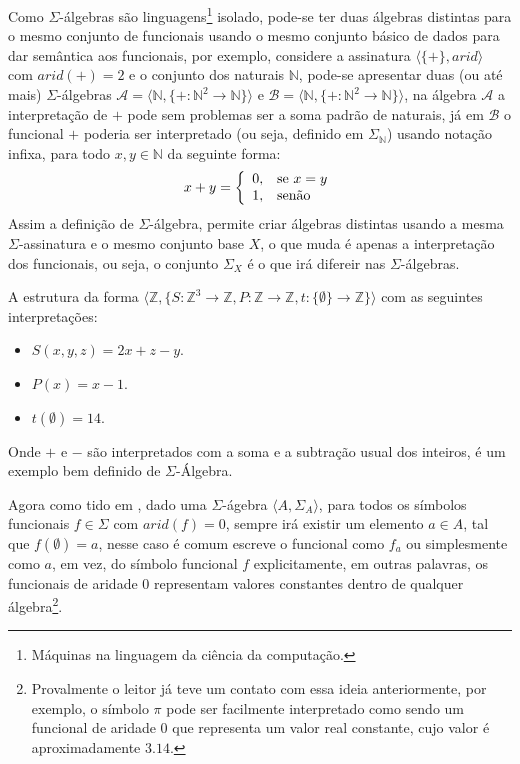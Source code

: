 \begin{nota}
  Como $\Sigma$-álgebras são linguagens\footnote{Máquinas na linguagem da ciência da computação.} isolado, pode-se ter duas álgebras distintas para o mesmo conjunto de funcionais usando o mesmo conjunto básico de dados para dar semântica aos funcionais, por exemplo, considere a assinatura $\langle \{+\}, arid \rangle$ com $arid(+)  = 2$ e o conjunto dos naturais $\mathbb{N}$, pode-se apresentar duas (ou até mais) $\Sigma$-álgebras $\mathcal{A} = \langle \mathbb{N}, \{+ :\mathbb{N}^2 \rightarrow \mathbb{N}\} \rangle$ e $\mathcal{B} = \langle \mathbb{N}, \{+ :\mathbb{N}^2 \rightarrow \mathbb{N}\} \rangle$, na álgebra $\mathcal{A}$ a interpretação de $+$ pode sem problemas ser a soma padrão de naturais, já em $\mathcal{B}$ o funcional $+$ poderia ser interpretado (ou seja, definido em $\Sigma_\mathbb{N}$) usando notação infixa, para todo $x, y \in \mathbb{N}$ da seguinte forma:
  \begin{eqnarray*}
    x + y = \left\{\begin{array}{ll}	0, & \hbox{se } x = y\\1,  & \hbox{senão}\end{array}\right.
  \end{eqnarray*}
  Assim a definição de $\Sigma$-álgebra, permite criar álgebras distintas usando a mesma $\Sigma$-assinatura e o mesmo conjunto base $X$, o que muda é apenas a interpretação dos funcionais, ou seja, o conjunto $\Sigma_X$ é o que irá difereir nas $\Sigma$-álgebras.
\end{nota}

\begin{exemplo}\label{exe:AlgebraUniversal1}
  A estrutura da forma $\langle \mathbb{Z}, \{S : \mathbb{Z}^3 \rightarrow \mathbb{Z}, P : \mathbb{Z} \rightarrow \mathbb{Z}, t:\{\emptyset\} \rightarrow \mathbb{Z} \} \rangle$ com as seguintes interpretações:
  \begin{itemize}
    \item $S(x, y, z) = 2x + z - y$.
    \item $P(x) = x - 1$.
    \item $t(\emptyset) = 14$.
  \end{itemize}
  Onde $+$ e $-$ são interpretados com a soma e a subtração usual dos inteiros, é um exemplo bem definido de $\Sigma$-Álgebra.
\end{exemplo}

Agora como tido em \cite{klaus2001}, dado uma $\Sigma$-ágebra $\langle A, \Sigma_A \rangle$, para todos os símbolos funcionais $f \in \Sigma$ com $arid(f) = 0$, sempre irá existir um elemento $a \in A$, tal que $f(\emptyset) = a$, nesse caso é comum escreve o funcional como $f_a$ ou simplesmente como $a$, em vez, do símbolo funcional $f$ explicitamente, em outras palavras, os funcionais de aridade $0$ representam valores constantes dentro de qualquer álgebra\footnote{Provalmente o leitor já teve um contato com essa ideia anteriormente, por exemplo, o símbolo $\pi$ pode ser facilmente interpretado como sendo um funcional de aridade $0$ que representa um valor real constante, cujo valor é aproximadamente $3.14$.}.

